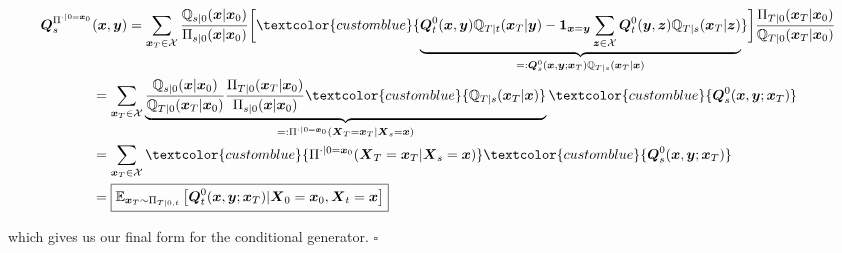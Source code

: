 \documentclass{article}
\newcommand{\bluetext}[1]{\textcolor{customblue}{#1}}
\begin{document}
\begin{small}
\begin{align}
    \boldsymbol{Q}_s^{\Pi^{\cdot|0=\boldsymbol{x}_0}}&(\boldsymbol{x},\boldsymbol{y})
    =\sum_{\boldsymbol{x}_T\in \mathcal{X}}\frac{\mathbb{Q}_{s|0}(\boldsymbol{x}|\boldsymbol{x}_0)}{\Pi_{s|0}(\boldsymbol{x}|\boldsymbol{x}_0)}\bigg[\bluetext{\underbrace{\boldsymbol{Q}^0_t(\boldsymbol{x},\boldsymbol{y})\mathbb{Q}_{T|t}(\boldsymbol{x}_T|\boldsymbol{y})-\boldsymbol{1}_{\boldsymbol{x}=\boldsymbol{y}}\sum_{\boldsymbol{z}\in \mathcal{X}}\boldsymbol{Q}_t^0(\boldsymbol{y}, \boldsymbol{z})\mathbb{Q}_{T|s}(\boldsymbol{x}_T|\boldsymbol{z})}_{=:\boldsymbol{Q}_s^0(\boldsymbol{x}, \boldsymbol{y};\boldsymbol{x}_T)\mathbb{Q}_{T|s}(\boldsymbol{x}_T|\boldsymbol{x})}}\bigg]\frac{\Pi_{T|0}(\boldsymbol{x}_T|\boldsymbol{x}_0)}{\mathbb{Q}_{T|0}(\boldsymbol{x}_T|\boldsymbol{x}_0)}\nonumber\\
    &=\sum_{\boldsymbol{x}_T\in \mathcal{X}}\underbrace{\frac{\mathbb{Q}_{s|0}(\boldsymbol{x}|\boldsymbol{x}_0)}{\mathbb{Q}_{T|0}(\boldsymbol{x}_T|\boldsymbol{x}_0)}\frac{\Pi_{T|0}(\boldsymbol{x}_T|\boldsymbol{x}_0)}{\Pi_{s|0}(\boldsymbol{x}|\boldsymbol{x}_0)}\bluetext{\mathbb{Q}_{T|s}(\boldsymbol{x}_T|\boldsymbol{x})}}_{=:\Pi^{\cdot|0=\boldsymbol{x}_0}(\boldsymbol{X}_T=\boldsymbol{x}_T|\boldsymbol{X}_s=\boldsymbol{x})}\bluetext{\boldsymbol{Q}_s^0(\boldsymbol{x}, \boldsymbol{y};\boldsymbol{x}_T)}\nonumber\\
    &=\sum_{\boldsymbol{x}_T\in \mathcal{X}}\bluetext{\Pi^{\cdot|0=\boldsymbol{x}_0}(\boldsymbol{X}_T=\boldsymbol{x}_T|\boldsymbol{X}_s=\boldsymbol{x})}\bluetext{\boldsymbol{Q}_s^0(\boldsymbol{x}, \boldsymbol{y};\boldsymbol{x}_T)}\nonumber\\
    &=\boxed{\mathbb{E}_{\boldsymbol{x}_T\sim \Pi_{T|0,t}}\left[\boldsymbol{Q}^0_t(\boldsymbol{x}, \boldsymbol{y};\boldsymbol{x}_T)|\boldsymbol{X}_0=\boldsymbol{x}_0, \boldsymbol{X}_t=\boldsymbol{x}\right]}
\end{align}
\end{small}
which gives us our final form for the conditional generator. \hfill $\square$
\end{document}
